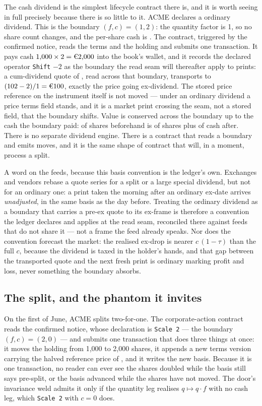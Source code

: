 The cash dividend is the simplest lifecycle contract there is, and it is worth seeing
in full precisely because there is so little to it. ACME declares a  ordinary
dividend. This is the boundary $(f, c) = (1, 2)$: the quantity factor is 1, so no
share count changes, and the per-share cash is . The contract, triggered by
the confirmed notice, reads the terms and the holding and submits one transaction. It
pays cash $1{,}000 \times 2 = \EUR{2{,}000}$ into the book's wallet, and it records
the declared operator \texttt{Shift} $-2$ as the boundary the read seam will
thereafter apply to prints: a cum-dividend quote of , read across that
boundary, transports to $(102 - 2)/1 = \EUR{100}$, exactly the price going
ex-dividend. The stored price reference on the instrument itself is not moved --- under
an ordinary dividend a price terms field stands, and it is a market print crossing the
seam, not a stored field, that the boundary shifts. Value is conserved across the
boundary up to the cash the boundary paid:
 of shares beforehand is  of shares plus 
of cash after. There is no separate dividend engine. There is a contract that reads a
boundary and emits moves, and it is the same shape of contract that will, in a
moment, process a split.

A word on the feeds, because this basis convention is the ledger's own. Exchanges and
vendors rebase a quote series for a split or a large special dividend, but not for an
ordinary one: a print taken the morning after an ordinary ex-date arrives
\emph{unadjusted}, in the same basis as the day before. Treating the  ordinary
dividend as a boundary that carries a pre-ex quote to its ex-frame is therefore a
convention the ledger declares and applies at the read seam, reconciled there against
feeds that do not share it --- not a frame the feed already speaks. Nor does the
convention forecast the market: the realised ex-drop is nearer $c\,(1-\tau)$ than the
full $c$, because the dividend is taxed in the holder's hands, and that gap between the
transported quote and the next fresh print is ordinary marking profit and loss, never
something the boundary absorbs.

\subsection{The split, and the phantom it invites}

On the first of June, ACME splits two-for-one. The corporate-action contract reads
the confirmed notice, whose declaration is \texttt{Scale 2} --- the boundary
$(f, c) = (2, 0)$ --- and submits one transaction that does three things at once: it
moves the holding from 1{,}000 to 2{,}000 shares, it appends a new terms version
carrying the halved reference price of , and it writes the new basis. Because
it is one transaction, no reader can ever see the shares doubled while the basis still
says pre-split, or the basis advanced while the shares have not moved. The door's
invariance weld admits it only if the quantity leg realises $q \mapsto q \cdot f$ with
no cash leg, which \texttt{Scale 2} with $c = 0$ does.

